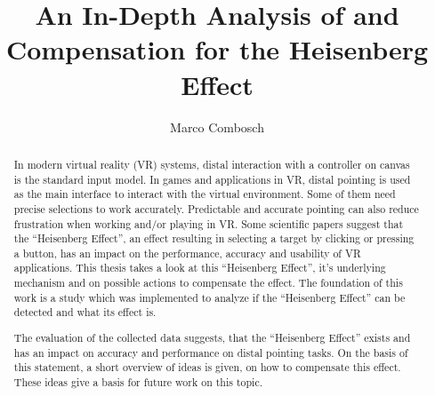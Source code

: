 \documentclass[uulm-release-print]{thesis-uulm}
\author{Marco Combosch}
\title{An In-Depth Analysis of and Compensation for the Heisenberg Effect}
\begin{document}
\frontmatter %
\begin{nolinenumbers}
\maketitle

\copyrightpage
\end{nolinenumbers}


\begin{abstract}

In modern virtual reality (VR) systems, distal interaction with a controller on canvas is the standard input model. In games and applications in VR, distal pointing is used as the main interface to interact with the virtual environment. Some of them need precise selections to work accurately. Predictable and accurate pointing can also reduce frustration when working and/or playing in VR. Some scientific papers suggest that the ``Heisenberg Effect'', an effect resulting in selecting a target by clicking or pressing a button, has an impact on the performance, accuracy and usability of VR applications. This thesis takes a look at this ``Heisenberg Effect'', it's underlying mechanism and on possible actions to compensate the effect. The foundation of this work is a study which was implemented to analyze if the ``Heisenberg Effect'' can be detected and what its effect is. 

The evaluation of the collected data suggests, that the ``Heisenberg Effect'' exists and has an impact on accuracy and performance on distal pointing tasks. On the basis of this statement, a short overview of ideas is given, on how to compensate this effect. These ideas give a basis for future work on this topic.

\end{abstract}

\begin{nolinenumbers}
\tableofcontents
\end{nolinenumbers}

\mainmatter %







\backmatter %

\listoffigures
\listoftables

%

\cleardoublepage
\clearscrheadfoot
\declaration
\end{document}
